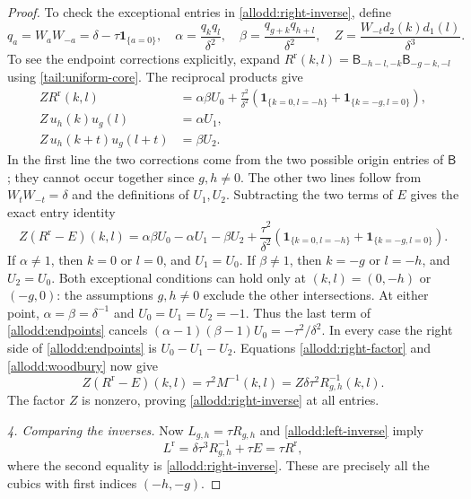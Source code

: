 \documentclass[10pt,a4paper]{amsart}
\newcommand{\ind}[1]{\mathbf1_{\{#1\}}}
\begin{document}
\begin{proof}
To check the exceptional entries in
\eqref{allodd:right-inverse}, define
\[
 q_a=W_aW_{-a}=\delta-\tau\ind{a=0},\quad
 \alpha=\frac{q_kq_l}{\delta^2},\quad
 \beta=\frac{q_{g+k}q_{h+l}}{\delta^2},\quad
 Z=\frac{W_{-t}d_2(k)d_1(l)}{\delta^3}.
\]
To see the endpoint corrections explicitly, expand
$R^{\mathrm r}(k,l)=\mathsf B_{-h-l,-k}\mathsf B_{-g-k,-l}$
using \eqref{tail:uniform-core}. The reciprocal products give
\[
\begin{aligned}
 ZR^{\mathrm r}(k,l)
   &=\alpha\beta U_0+\frac{\tau^2}{\delta^2}
       (\ind{k=0,l=-h}+\ind{k=-g,l=0}),\\
 Z\,u_h(k)u_g(l)&=\alpha U_1,\\
 Z\,u_h(k+t)u_g(l+t)&=\beta U_2.
\end{aligned}
\]
In the first line the two corrections come from the two possible
origin entries of $\mathsf B$; they cannot occur together since
$g,h\ne0$. The other two lines follow from $W_tW_{-t}=\delta$
and the definitions of $U_1,U_2$.
Subtracting the two terms of $E$ gives the exact entry identity
\begin{equation}\label{allodd:endpoints}
 Z(R^{\mathrm r}-E)(k,l)
  =\alpha\beta U_0-\alpha U_1-\beta U_2
     +\frac{\tau^2}{\delta^2}
        (\ind{k=0,l=-h}+\ind{k=-g,l=0}).
\end{equation}
If $\alpha\ne1$, then $k=0$ or $l=0$, and $U_1=U_0$.
If $\beta\ne1$, then $k=-g$ or $l=-h$, and $U_2=U_0$.
Both exceptional conditions can hold only at $(k,l)=(0,-h)$
or $(-g,0)$: the assumptions $g,h\ne0$ exclude the other
intersections.  At either point,
$\alpha=\beta=\delta^{-1}$ and $U_0=U_1=U_2=-1$.
Thus the last term of \eqref{allodd:endpoints} cancels
$(\alpha-1)(\beta-1)U_0=-\tau^2/\delta^2$.
In every case the right side of \eqref{allodd:endpoints} is
$U_0-U_1-U_2$.  Equations \eqref{allodd:right-factor} and
\eqref{allodd:woodbury} now give
\[
 Z(R^{\mathrm r}-E)(k,l)
   =\tau^2M^{-1}(k,l)
   =Z\delta\tau^2R_{g,h}^{-1}(k,l).
\]
The factor $Z$ is nonzero, proving
\eqref{allodd:right-inverse} at all entries.

\emph{4. Comparing the inverses.} Now $L_{g,h}=\tau R_{g,h}$ and
\eqref{allodd:left-inverse} imply
\[
 L^{\mathrm r}=\delta\tau^3R_{g,h}^{-1}+\tau E
             =\tau R^{\mathrm r},
\]
where the second equality is \eqref{allodd:right-inverse}.
These are precisely all the cubics with first indices $(-h,-g)$.
\end{proof}
\end{document}
